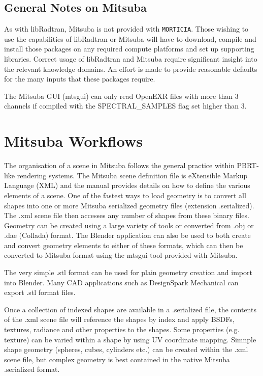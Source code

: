 \subsection{General Notes on Mitsuba}\label{general-notes-on-mitsuba}

As with libRadtran, Mitsuba is not provided with \texttt{MORTICIA}.
Those wishing to use the capabilities of libRadtran or Mitsuba will have
to download, compile and install those packages on any required compute
platforms and set up supporting libraries. Correct usage of libRadtran
and Mitsuba require significant insight into the relevant knowledge
domains. An effort is made to provide reasonable defaults for the many
inputs that these packages require.

The Mitsuba GUI (mtsgui) can only read OpenEXR files with more than 3
channels if compiled with the SPECTRAL\_SAMPLES flag set higher than 3.

\section{Mitsuba Workflows}\label{mitsuba-workflows}

The organisation of a scene in Mitsuba follows the general practice
within PBRT-like rendering systems. The Mitsuba scene definition file is
eXtensible Markup Language (XML) and the manual provides details on how
to define the various elements of a scene. One of the fastest ways to
load geometry is to convert all shapes into one or more Mitsuba
serialized geometry files (extension .serialized). The .xml scene file
then accesses any number of shapes from these binary files. Geometry can
be created using a large variety of tools or converted from .obj or .dae
(Collada) format. The Blender application can also be used to both
create and convert geometry elements to either of these formats, which
can then be converted to Mitsuba format using the mtsgui tool provided
with Mitsuba.

The very simple .stl format can be used for plain geometry creation and
import into Blender. Many CAD applications such as DesignSpark
Mechanical can export .stl format files.

Once a collection of indexed shapes are available in a .serialized file,
the contents of the .xml scene file will reference the shapes by index
and apply BSDFs, textures, radiance and other properties to the shapes.
Some properties (e.g. texture) can be varied within a shape by using UV
coordinate mapping. Simnple shape geometry (spheres, cubes, cylinders
etc.) can be created within the .xml scene file, but complex geometry is
best contained in the native Mitsuba .serialized format.

